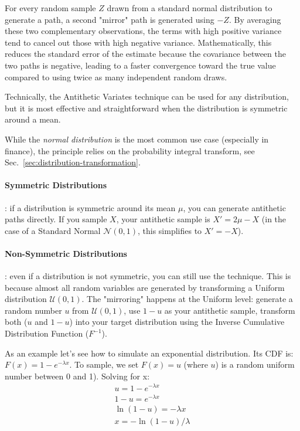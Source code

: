 For every random sample $Z$ drawn from a standard normal distribution to generate a path, a second "mirror" path is generated using $-Z$. By averaging these two complementary observations, the terms with high
positive variance tend to cancel out those with high negative variance. Mathematically, this reduces the standard error of the estimate because the covariance between the two paths is negative, leading to a faster
convergence toward the true value compared to using twice as many independent random draws.
	
Technically, the Antithetic Variates technique can be used for any distribution, but it is most effective and straightforward when the distribution is symmetric around a mean.
	
While the \emph{normal distribution} is the most common use case (especially in finance), the principle relies on the probability integral transform, see Sec.~\ref{sec:distribution-transformation}.

\paragraph{Symmetric Distributions}: if a distribution is symmetric around its mean $\mu$, you can generate antithetic paths directly. If you sample $X$, your antithetic sample is $X'=2\mu -X$ 
(in the case of a Standard Normal $\mathcal{N}(0,1)$, this simplifies to $X'=-X$).

\paragraph{Non-Symmetric Distributions}: even if a distribution is not symmetric, you can still use the technique. This is because almost all random variables are generated by transforming a Uniform distribution $\mathcal{U}(0,1)$. The "mirroring" happens at the Uniform level: generate a random number $u$ from $\mathcal{U}(0,1)$, use $1-u$ as your antithetic sample, transform both ($u$ and $1-u$) into your target
distribution using the Inverse Cumulative Distribution Function ($F^{-1}$).

As an example let's see how to simulate an exponential distribution. Its CDF is: $F(x)=1-e^{-\lambda x}$. To sample, we set $F(x)=u$ (where $u$) is a random uniform number
between 0 and 1). Solving for x: 
\begin{equation}
	\begin{gathered}
		u=1-e^{-\lambda x} \\
		1-u=e^{-\lambda x} \\
		\ln(1-u)=-\lambda x \\
		x=-\ln(1-u)/\lambda
	\end{gathered}
\end{equation}

